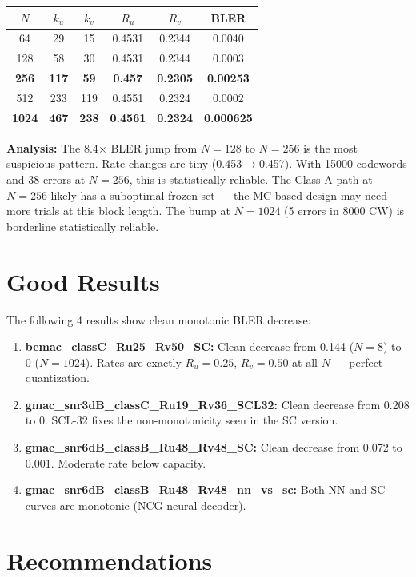 \documentclass[11pt,a4paper]{article}
\newcommand{\up}[1]{\textcolor{upcolor}{\textbf{#1}}}
\begin{document}
\begin{tabular}{cccccc}
\toprule
$N$ & $k_u$ & $k_v$ & $R_u$ & $R_v$ & BLER \\
\midrule
64 & 29 & 15 & 0.4531 & 0.2344 & 0.0040 \\
128 & 58 & 30 & 0.4531 & 0.2344 & 0.0003 \\
\textbf{256} & \textbf{117} & \textbf{59} & \textbf{0.457} & \textbf{0.2305} & \up{0.00253} \\
512 & 233 & 119 & 0.4551 & 0.2324 & 0.0002 \\
\textbf{1024} & \textbf{467} & \textbf{238} & \textbf{0.4561} & \textbf{0.2324} & \up{0.000625} \\
\bottomrule
\end{tabular}

\textbf{Analysis:} The 8.4$\times$ BLER jump from $N=128$ to $N=256$ is the most suspicious pattern. Rate changes are tiny (0.453$\to$0.457). With 15000 codewords and 38 errors at $N=256$, this is statistically reliable. The Class A path at $N=256$ likely has a suboptimal frozen set — the MC-based design may need more trials at this block length. The bump at $N=1024$ (5 errors in 8000 CW) is borderline statistically reliable.

\section{Good Results}

The following 4 results show clean monotonic BLER decrease:

\begin{enumerate}
\item \textbf{bemac\_classC\_Ru25\_Rv50\_SC:} Clean decrease from 0.144 ($N=8$) to 0 ($N=1024$). Rates are exactly $R_u=0.25$, $R_v=0.50$ at all $N$ — perfect quantization.
\item \textbf{gmac\_snr3dB\_classC\_Ru19\_Rv36\_SCL32:} Clean decrease from 0.208 to 0. SCL-32 fixes the non-monotonicity seen in the SC version.
\item \textbf{gmac\_snr6dB\_classB\_Ru48\_Rv48\_SC:} Clean decrease from 0.072 to 0.001. Moderate rate below capacity.
\item \textbf{gmac\_snr6dB\_classB\_Ru48\_Rv48\_nn\_vs\_sc:} Both NN and SC curves are monotonic (NCG neural decoder).
\end{enumerate}

\section{Recommendations}
\end{document}

